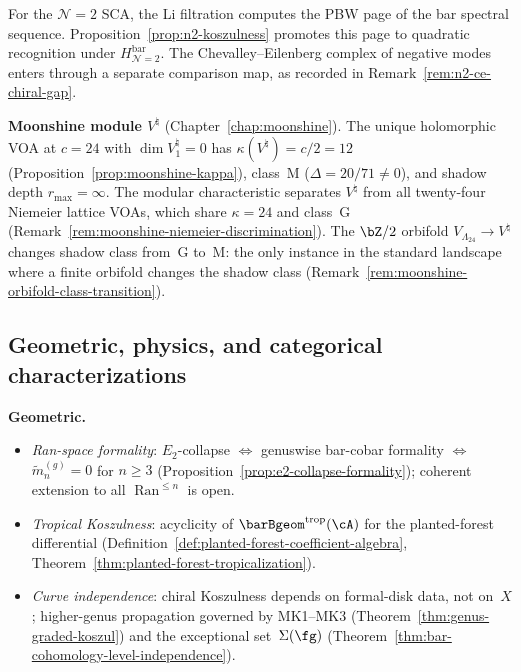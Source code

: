 \noindent
For the $\mathcal N=2$ SCA, the Li filtration computes the PBW page of
the bar spectral sequence.  Proposition~\ref{prop:n2-koszulness}
promotes this page to quadratic recognition under
$H_{\mathcal N=2}^{\mathrm{bar}}$.  The Chevalley--Eilenberg complex of
negative modes enters through a separate comparison map, as recorded
in Remark~\ref{rem:n2-ce-chiral-gap}.

\smallskip\noindent\textbf{Moonshine module $V^\natural$}
(Chapter~\ref{chap:moonshine}).
The unique holomorphic VOA at $c = 24$ with $\dim V_1^\natural = 0$
has $\kappa(V^\natural) = c/2 = 12$
(Proposition~\ref{prop:moonshine-kappa}), class~M
($\Delta = 20/71 \neq 0$), and shadow depth $r_{\max} = \infty$.
The modular characteristic separates $V^\natural$ from all
twenty-four Niemeier lattice VOAs, which share $\kappa = 24$
and class~G
(Remark~\ref{rem:moonshine-niemeier-discrimination}).
The $\bZ/2$ orbifold $V_{\Lambda_{24}} \to V^\natural$ changes
shadow class from~G to~M: the only instance in the standard
landscape where a finite orbifold changes the shadow class
(Remark~\ref{rem:moonshine-orbifold-class-transition}).

\subsection{Geometric, physics, and categorical
 characterizations}
\label{subsec:concordance-further-characterizations}

\noindent\textbf{Geometric.}
\begin{itemize}[nosep]
\item \emph{Ran-space formality}: $E_2$-collapse $\Leftrightarrow$ genuswise bar-cobar formality $\Leftrightarrow$ $\tilde{m}_n^{(g)} = 0$ for $n \ge 3$ (Proposition~\ref{prop:e2-collapse-formality}); coherent extension to all $\operatorname{Ran}^{\le n}$ is open.
\item \emph{Tropical Koszulness}: acyclicity of $\barBgeom^{\mathrm{trop}}(\cA)$ for the planted-forest differential (Definition~\ref{def:planted-forest-coefficient-algebra}, Theorem~\ref{thm:planted-forest-tropicalization}).
\item \emph{Curve independence}: chiral Koszulness depends on formal-disk data, not on~$X$; higher-genus propagation governed by MK1--MK3 (Theorem~\ref{thm:genus-graded-koszul}) and the exceptional set~$\Sigma(\fg)$ (Theorem~\ref{thm:bar-cohomology-level-independence}).
\end{itemize}

